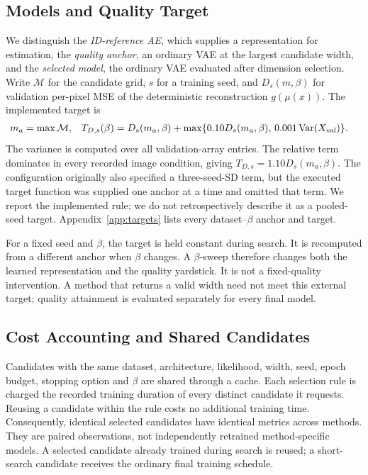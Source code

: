 \documentclass[make,article,submit,pdftex,moreauthors]{Definitions/mdpi}
\begin{document}
\subsection{Models and Quality Target}\label{sec:quality}
We distinguish the \emph{ID-reference AE}, which supplies a representation
for estimation, the \emph{quality anchor}, an ordinary VAE at the largest
candidate width, and the \emph{selected model}, the ordinary VAE evaluated
after dimension selection. Write $\mathcal M$ for the candidate grid,
$s$ for a training seed, and $D_s(m,\beta)$ for validation per-pixel MSE
of the deterministic reconstruction $g(\mu(x))$. The implemented target is
\begin{align}
 m_a&=\max\mathcal M, &
 T_{D,s}(\beta)&=D_s(m_a,\beta)
 +\max\{0.10D_s(m_a,\beta),\,0.001\operatorname{Var}(X_{\rm val})\}.
 \label{eq:target}
\end{align}
The variance is computed over all validation-array entries. The relative
term dominates in every recorded image condition, giving
$T_{D,s}=1.10D_s(m_a,\beta)$. The configuration originally also specified a
three-seed-SD term, but the executed target function was supplied one
anchor at a time and omitted that term. We report the implemented rule;
we do not retrospectively describe it as a pooled-seed target.
Appendix~\ref{app:targets} lists every dataset--$\beta$ anchor and target.

For a fixed seed and $\beta$, the target is held constant during search.
It is recomputed from a different anchor when $\beta$ changes. A
$\beta$-sweep therefore changes both the learned representation and the
quality yardstick. It is not a fixed-quality intervention. A method that
returns a valid width need not meet this external target; quality
attainment is evaluated separately for every final model.

\subsection{Cost Accounting and Shared Candidates}\label{sec:cost}
Candidates with the same dataset, architecture, likelihood, width, seed,
epoch budget, stopping option and $\beta$ are shared through a cache.
Each selection rule is charged the recorded training duration of every
distinct candidate it requests. Reusing a candidate within the rule costs
no additional training time. Consequently, identical selected candidates
have identical metrics across methods. They are paired observations, not
independently retrained method-specific models. A selected candidate
already trained during search is reused; a short-search candidate receives
the ordinary final training schedule.
\end{document}
